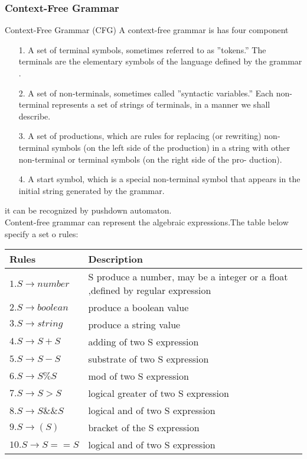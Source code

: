 \subsubsection{Context-Free Grammar}
Context-Free Grammar (CFG)
A context-free grammar is has four component
\begin{itemize}
\item [1.] A set of terminal symbols, sometimes referred to as ”tokens.” The
terminals are the elementary symbols of the language defined by the
grammar .
\item [2.] A set of non-terminals, sometimes called ”syntactic variables.” Each
non- terminal represents a set of strings of terminals, in a manner we
shall describe.
\item [3.] A set of productions, which are rules for replacing (or rewriting) non-
terminal symbols (on the left side of the production) in a string with
other non-terminal or terminal symbols (on the right side of the pro-
duction).
\item [4.] A start symbol, which is a special non-terminal symbol that appears in the initial string generated by the grammar.
\end{itemize}
\cite{aho1986compilers} it can be recognized by pushdown automaton.\\

Content-free grammar can represent the algebraic expressions.The table below specify a set o rules:

\begin{tabular}{|p{6cm}|p{6cm}|}
\hline \textbf{Rules} & \textbf{Description}\\ 
\hline  $1. S \rightarrow number $ & S produce a number, may be a integer or a float ,defined by regular expression  \\ 
\hline  $2.  S \rightarrow boolean $ &  produce a boolean value \\ 
\hline  $3. S \rightarrow string $&  produce a string value \\ 
\hline  $4.S \rightarrow S+S $&  adding of two S expression\\ 
\hline  $5.S \rightarrow S-S $ &  substrate of two S expression\\
\hline $6.S\rightarrow S \%S $ & mod of two S expression \\
\hline $7. S\rightarrow S > S $ &  logical greater  of two S expression\\
\hline $8.S \rightarrow S \&\& S $ & logical and of two S expression \\
\hline $9.S \rightarrow ( S) $ &  bracket of the S expression\\
\hline $10.S \rightarrow S == S $ & logical and of two S expression \\
\hline 
\end{tabular} 

